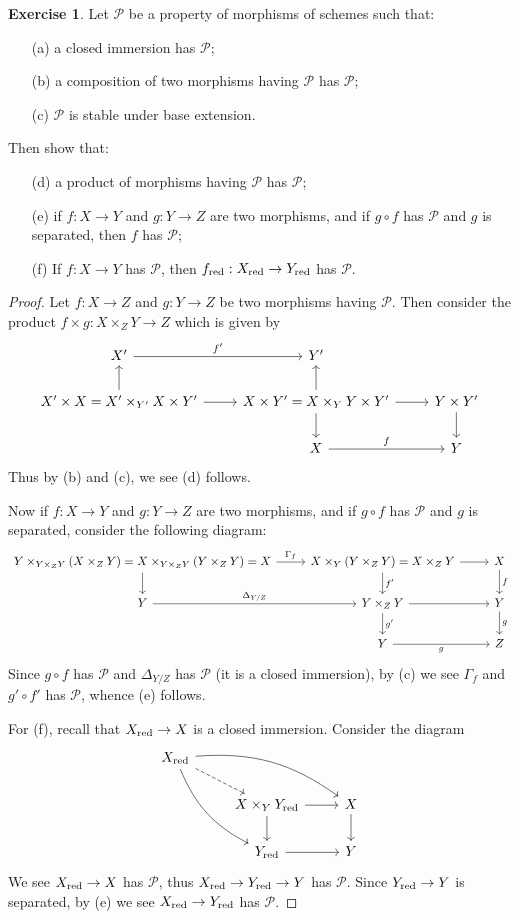 \documentclass[11pt]{book}
\theoremstyle{definition}
\newtheorem{exercise}{Exercise}[section]
\begin{document}
\begin{exercise}
Let $\mathcal{P}$ be a property of morphisms of schemes such that:
\begin{itemize}
\item[(a)] a closed immersion has $\mathcal{P}$;
\item[(b)] a composition of two morphisms having $\mathcal{P}$ has $\mathcal{P}$;
\item[(c)] $\mathcal{P}$ is stable under base extension.
\end{itemize}
Then show that:
\begin{itemize}
\item[(d)] a product of morphisms having $\mathcal{P}$ has $\mathcal{P}$;
\item[(e)] if $f:X\to Y$ and $g:Y\to Z$ are two morphisms, and if $g\circ f$ has $\mathcal{P}$ and $g$ is separated, then $f$ has $\mathcal{P}$;
\item[(f)] If $f:X\to Y$ has $\mathcal{P}$, then $f_{\mathrm{red}}:X_{\mathrm{red}}\to Y_{\mathrm{red}}$ has $\mathcal{P}$.
\end{itemize}
\end{exercise}
\begin{proof}
Let $f:X\to Z$ and $g:Y\to Z$ be two morphisms having $\mathcal{P}$. Then consider the product $f\times g:X\times_ZY\to Z$ which is given by
\[\begin{tikzcd}
X'\ar[r,"f'"]&Y'&\\
X'\times X=X'\times_{Y'}X\times Y'\ar[r]\ar[u]&X\times Y'=X\times_YY\times Y'\ar[r]\ar[u]\ar[d]&Y\times Y'\ar[d]\\
&X\ar[r,"f"]&Y
\end{tikzcd}\]
Thus by (b) and (c), we see (d) follows.\par
Now if $f:X\to Y$ and $g:Y\to Z$ are two morphisms, and if $g\circ f$ has $\mathcal{P}$ and $g$ is separated, consider the following diagram:
\[\begin{tikzcd}
Y\times_{Y\times_ZY}(X\times_ZY)=X\times_{Y\times_ZY}(Y\times_ZY)=X\ar[d]\ar[r,"\Gamma_f"]&X\times_Y(Y\times_ZY)=X\times_ZY\ar[r]\ar[d,"f'"]&X\ar[d,"f"]\\
Y\ar[r,"\Delta_{Y/Z}"]&Y\times_ZY\ar[d,"g'"]\ar[r]&Y\ar[d,"g"]\\
&Y\ar[r,swap,"g"]&Z
\end{tikzcd}\]
Since $g\circ f$ has $\mathcal{P}$ and $\Delta_{Y/Z}$ has $\mathcal{P}$ (it is a closed immersion), by (c) we see $\Gamma_f$ and $g'\circ f'$ has $\mathcal{P}$, whence (e) follows.\par
For (f), recall that $X_{\mathrm{red}}\to X$ is a closed immersion. Consider the diagram
\[\begin{tikzcd}
X_{\red}\ar[rrd,bend left=20pt]\ar[rdd,bend right=20pt]\ar[rd,dashed]&&\\
&X\times_YY_{\red}\ar[d]\ar[r]&X\ar[d]\\
&Y_{\red}\ar[r]&Y
\end{tikzcd}\]
We see $X_{\mathrm{red}}\to X$ has $\mathcal{P}$, thus $X_{\mathrm{red}}\to Y_{\mathrm{red}}\to Y$ has $\mathcal{P}$. Since $Y_{\mathrm{red}}\to Y$ is separated, by (e) we see $X_{\mathrm{red}}\to Y_{\mathrm{red}}$ has $\mathcal{P}$.
\end{proof}
\end{document}
